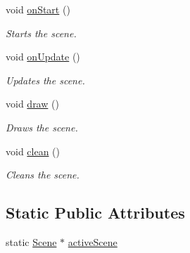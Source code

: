\begin{DoxyCompactItemize}
void \hyperlink{class_cookie_eng_1_1_scene_1_1_scene_ab66ffdb5475b0045d0ce5a846488590c}{on\+Start} ()
\begin{DoxyCompactList}\small\item\em Starts the scene. \end{DoxyCompactList}\item 
void \hyperlink{class_cookie_eng_1_1_scene_1_1_scene_a10fa9798a2d0cff5527a4ca160a5202f}{on\+Update} ()
\begin{DoxyCompactList}\small\item\em Updates the scene. \end{DoxyCompactList}\item 
void \hyperlink{class_cookie_eng_1_1_scene_1_1_scene_a94dbc42f8c5b2f7774d8e0de1f5e45a7}{draw} ()
\begin{DoxyCompactList}\small\item\em Draws the scene. \end{DoxyCompactList}\item 
void \hyperlink{class_cookie_eng_1_1_scene_1_1_scene_a3e1fa17bfd8e0e3af72db05c7a5ae0b3}{clean} ()
\begin{DoxyCompactList}\small\item\em Cleans the scene. \end{DoxyCompactList}\end{DoxyCompactItemize}
\subsection*{Static Public Attributes}
\begin{DoxyCompactItemize}
\item 
static \hyperlink{class_cookie_eng_1_1_scene_1_1_scene}{Scene} $\ast$ \hyperlink{class_cookie_eng_1_1_scene_1_1_scene_a367277df49168535200a279da96d11c2}{active\+Scene}
\end{DoxyCompactItemize}
